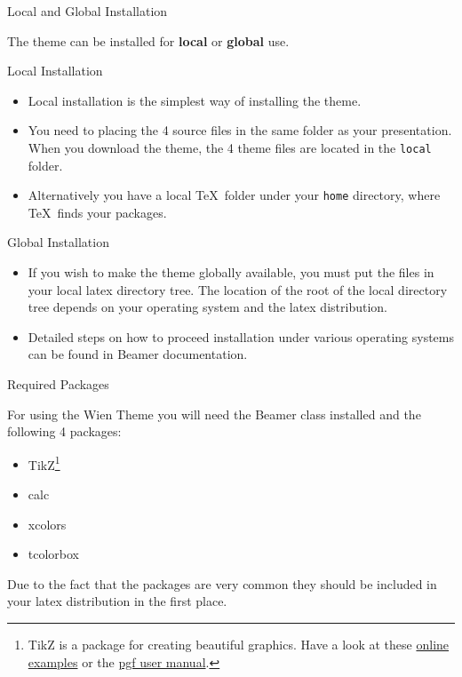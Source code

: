\documentclass{beamer}
\begin{document}
\begin{frame}{Local and Global Installation}
  
  The theme can be installed for \textbf{local} or \textbf{global} use.
  \begin{block}{Local Installation}
  \begin{itemize}    
    \item Local installation is the simplest way of installing the theme. 
    \item You need to placing the 4 source files in the same folder as
      your presentation. When you download the theme, the 4 theme
      files are located in the {\tt local} folder.
    \item Alternatively you have a local \TeX\  folder under your \texttt{home}
      directory, where \TeX\  finds your packages.
  \end{itemize}
  \end{block}

  \begin{block}{Global Installation}
  \begin{itemize}
     \item If you wish to make the theme globally available, you must
       put the files in your local latex directory tree. The location
       of the root of the local directory tree depends on your
       operating system and the latex distribution.
     \item Detailed steps on how to proceed installation under various
       operating systems can be found in Beamer documentation.
  \end{itemize}
  \end{block}
\end{frame}

\begin{frame}{Required Packages}
  \begin{block}{}
    For using the Wien Theme you will need the Beamer class installed
    and the following 4 packages:
    \begin{itemize}
    \item TikZ\footnote{TikZ is a package for creating beautiful
        graphics. Have a look at these
        \href{http://www.texample.net/tikz/examples/}{online examples}
        or the
        \href{http://tug.ctan.org/tex-archive/graphics/pgf/base/doc/generic/pgf/pgfmanual.pdf}{pgf
          user manual}.}
    \item calc
    \item xcolors
    \item tcolorbox
    \end{itemize}
    Due to the fact that the packages are very common they should be
    included in your latex distribution in the first place.
  \end{block}
  \end{frame}
\end{document}
